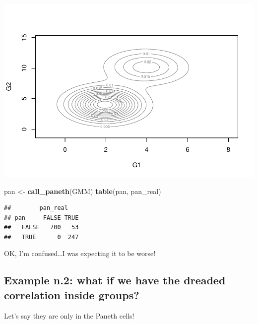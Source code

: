 \documentclass[]{article}
\newenvironment{Shaded}{\begin{snugshade}}{\end{snugshade}}
\newcommand{\KeywordTok}[1]{\textcolor[rgb]{0.13,0.29,0.53}{\textbf{#1}}}
\newcommand{\NormalTok}[1]{#1}
\newcommand{\StringTok}[1]{\textcolor[rgb]{0.31,0.60,0.02}{#1}}
\begin{document}
\includegraphics{covariance_gmm_files/figure-latex/fitfull_ex1-1.pdf}

\begin{Shaded}
\begin{Highlighting}[]
\NormalTok{pan <-}\StringTok{ }\KeywordTok{call_paneth}\NormalTok{(GMM)}
\KeywordTok{table}\NormalTok{(pan, pan_real)}
\end{Highlighting}
\end{Shaded}

\begin{verbatim}
##        pan_real
## pan     FALSE TRUE
##   FALSE   700   53
##   TRUE      0  247
\end{verbatim}

OK, I'm confused\ldots{}I was expecting it to be worse!

\hypertarget{example-n.2-what-if-we-have-the-dreaded-correlation-inside-groups}{%
\subsection{Example n.2: what if we have the dreaded correlation inside
groups?}\label{example-n.2-what-if-we-have-the-dreaded-correlation-inside-groups}}

Let's say they are only in the Paneth cells!
\end{document}
